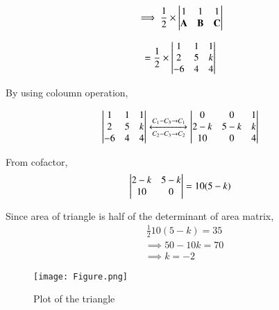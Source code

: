 \documentclass[journal,12pt,twocolumn]{IEEEtran}
\begin{document}
\begin{align}
   \implies  \frac12 \times  \begin{vmatrix}1 & 1 & 1  \\ 
\mathbf{A} & \mathbf{B} & \mathbf{C}\end{vmatrix}
\end{align}

\begin{align}
=  \frac12 \times  \begin{vmatrix}1 & 1 & 1  \\ 
 2 & 5 & k \\ 
-6 & 4 & 4\end{vmatrix}
\end{align}

 By using coloumn operation,

\begin{align}
   \begin{vmatrix}1 & 1 & 1  \\ 
 2 & 5 & k \\ 
-6 & 4 & 4\end{vmatrix}
\xleftrightarrow [C_2-C_3\rightarrow C_2]{C_1-C_3\rightarrow C_1}
 \begin{vmatrix}0 & 0 & 1  \\ 
 2-k & 5-k & k \\ 
10 & 0 & 4\end{vmatrix}
\end{align}

From cofactor, 
\begin{align}
     \begin{vmatrix}2-k & 5-k \\ 
10 & 0 \end{vmatrix} = 10(5-k)
\end{align}


Since area of triangle is half of the determinant of area matrix,
\begin{align}
  & \frac{1}{2}10(5-k) = 35
\end{align}
\begin{align}
  & \implies 50-10k = 70\\
  &\implies  k = -2
\end{align}
\begin{figure}[!h]
         \centering
         \texttt{[image: Figure.png]}
         \caption{Plot of the triangle}
         \label{Figure}
\end{figure}
\end{document}
